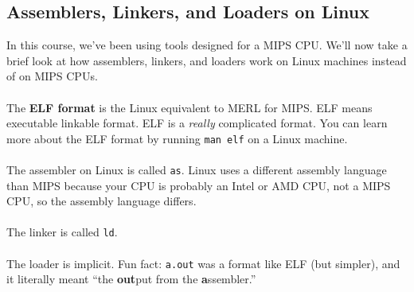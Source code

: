 \documentclass[]{article}
\theoremstyle{definition}
\newcommand{\lecture}[1]{\marginpar{{\footnotesize $\leftarrow$ \underline{#1}}}}
\begin{document}
			\subsection{Assemblers, Linkers, and Loaders on Linux} \lecture{February 1, 2013}
				In this course, we've been using tools designed for a MIPS CPU. We'll now take a brief look at how assemblers, linkers, and loaders work on Linux machines instead of on MIPS CPUs.
				\\ \\
				The \textbf{ELF format} is the Linux equivalent to MERL for MIPS. ELF means executable linkable format. ELF is a \emph{really} complicated format. You can learn more about the ELF format by running \verb+man elf+ on a Linux machine.
				\\ \\
				The assembler on Linux is called \verb+as+. Linux uses a different assembly language than MIPS because your CPU is probably an Intel or AMD CPU, not a MIPS CPU, so the assembly language differs.
				\\ \\
				The linker is called \verb+ld+.
				\\ \\
				The loader is implicit. Fun fact: \verb+a.out+ was a format like ELF (but simpler), and it literally meant ``the \textbf{out}put from the \textbf{a}ssembler.''
\end{document}
